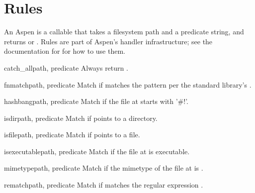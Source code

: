 \section{Rules}
\label {api-rules}

An Aspen  is a callable that takes a filesystem path and a predicate
string, and returns  or . Rules are part of Aspen's
handler infrastructure; see the documentation for  for how
to use them.


\begin{funcdesc}{catch_all}{path, predicate}
Always return .
\end{funcdesc}

\begin{funcdesc}{fnmatch}{path, predicate}
Match if  matches the pattern  per the standard
library's .
\end{funcdesc}

\begin{funcdesc}{hashbang}{path, predicate}
Match if the file at  starts with '\#!'.
\end{funcdesc}

\begin{funcdesc}{isdir}{path, predicate}
Match if  points to a directory.
\end{funcdesc}

\begin{funcdesc}{isfile}{path, predicate}
Match if  points to a file.
\end{funcdesc}

\begin{funcdesc}{isexecutable}{path, predicate}
Match if the file at  is executable.
\end{funcdesc}

\begin{funcdesc}{mimetype}{path, predicate}
Match if the mimetype of the file at  is .
\end{funcdesc}

\begin{funcdesc}{rematch}{path, predicate}
Match if  matches the regular expression .
\end{funcdesc}
